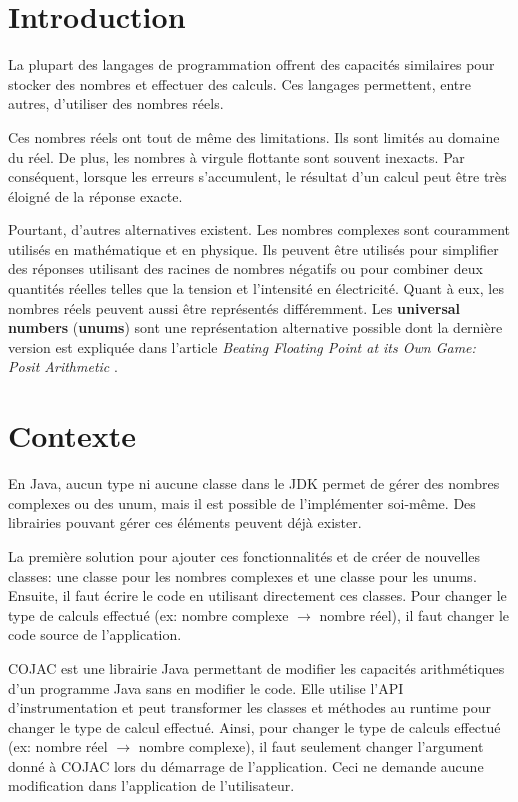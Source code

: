 \section{Introduction}

La plupart des langages de programmation offrent des capacités similaires pour stocker des nombres et effectuer des calculs. Ces langages permettent, entre autres, d'utiliser  des nombres réels.

Ces nombres réels ont tout de même des limitations. Ils sont limités au domaine du réel. De plus, les nombres à virgule flottante sont souvent inexacts. Par conséquent, lorsque les erreurs s'accumulent, le résultat d'un calcul peut être très éloigné de la réponse exacte.

Pourtant, d'autres alternatives existent. Les nombres complexes sont couramment utilisés en mathématique et en physique. Ils peuvent être utilisés pour simplifier des réponses utilisant des racines de nombres négatifs ou pour combiner deux quantités réelles telles que la tension et l'intensité en électricité. Quant à eux, les nombres réels peuvent aussi être représentés différemment. Les \textbf{universal numbers} (\textbf{unums}) sont une représentation alternative possible dont la dernière version est expliquée dans l'article \textit{Beating Floating Point at its Own Game: Posit Arithmetic} \cite{posit}.


\section{Contexte}

En Java, aucun type ni aucune classe dans le JDK permet de gérer des nombres complexes ou des unum, mais il est possible de l'implémenter soi-même. Des librairies pouvant gérer ces éléments peuvent déjà exister.

La première solution pour ajouter ces fonctionnalités et de créer de nouvelles classes: une classe pour les nombres complexes et une classe pour les unums. Ensuite, il faut écrire le code en utilisant directement ces classes. Pour changer le type de calculs effectué (ex: nombre complexe $\rightarrow$ nombre réel), il faut changer le code source de l'application.

COJAC \cite{COJAC} est une librairie Java permettant de modifier les capacités arithmétiques d'un programme Java sans en modifier le code. Elle utilise l'API d'instrumentation et peut transformer les classes et méthodes au runtime pour changer le type de calcul effectué. Ainsi, pour changer le type de calculs effectué (ex: nombre réel $\rightarrow$ nombre complexe), il faut seulement changer l'argument donné à COJAC \cite{COJAC} lors du démarrage de l'application. Ceci ne demande aucune modification dans l'application de l'utilisateur.

